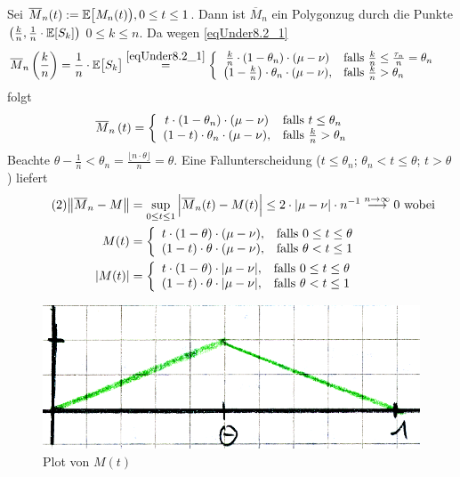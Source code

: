 Sei $\overline{M}_n(t):=\mathbb{E}\big[M_n(t)\big),0\leq t\leq 1$. 
Dann ist $\overline{M}_n$ ein Polygonzug durch die Punkte $\left(\frac{k}{n},\frac{1}{n}\cdot\mathbb{E}[S_k]\right)$ $0\leq k\leq n$.
Da wegen \eqref{eqUnder8.2_1} 
\begin{align*}
	\overline{M}_n\left(\frac{k}{n}\right)
	&=\frac{1}{n}\cdot\mathbb{E}\big[S_k\big]
	\overset{\eqref{eqUnder8.2_1}}
	=
	\left\lbrace\begin{array}{cl}
		\frac{k}{n}\cdot(1-\theta_n)\cdot(\mu-\nu) &\text{falls } \frac{k}{n}\leq\frac{\tau_n}{n}=\theta_n\\
		\left(1-\frac{k}{n}\right)\cdot\theta_n\cdot(\mu-\nu), & \text{falls } \frac{k}{n}>\theta_n
	\end{array}\right.
\end{align*}
folgt
\begin{align*}
	\overline{M}_n\left(t\right)
	&=\left\lbrace\begin{array}{cl}
		t\cdot(1-\theta_n)\cdot(\mu-\nu) &\text{falls } t\leq\theta_n\\
		\left(1-t\right)\cdot\theta_n\cdot(\mu-\nu), & \text{falls } \frac{k}{n}>\theta_n
	\end{array}\right.
\end{align*}
Beachte $\theta-\frac{1}{n}<\theta_n=\frac{\lfloor n\cdot\theta\rfloor}{n}=\theta$.
Eine Fallunterscheidung ($t\leq\theta_n$; $\theta_n<t\leq\theta$; $t>\theta$) liefert
\begin{align}\label{eqUnder8.2_2}\tag{2}
	\big\Vert\overline{M}_n-M\big\Vert
	&=\sup\limits_{0\leq t\leq 1}\Big|\overline{M}_n(t)-M(t)\Big|
	\leq 2\cdot|\mu-\nu|\cdot n^{-1}\overset{n\to\infty}{\longrightarrow}0\text{ wobei}\\\nonumber
	M(t)&=\left\lbrace\begin{array}{cl}
		t\cdot(1-\theta)\cdot(\mu-\nu) ,&\text{falls } 0\leq t\leq\theta\\
		(1-t)\cdot\theta\cdot(\mu-\nu), &\text{falls } \theta<t\leq 1
	\end{array}\right.\\\nonumber
	|M(t)|&=\left\lbrace\begin{array}{cl}
		t\cdot(1-\theta)\cdot|\mu-\nu| ,&\text{falls } 0\leq t\leq\theta\\
		(1-t)\cdot\theta\cdot|\mu-\nu|, &\text{falls } \theta<t\leq 1
	\end{array}\right.
\end{align}

\begin{figure}[H]
	\begin{center}
		\includegraphics[width=1\textwidth]{./pics/MSTAT005.png}
		\caption{Plot von $M(t)$}
	\end{center}
\end{figure}

